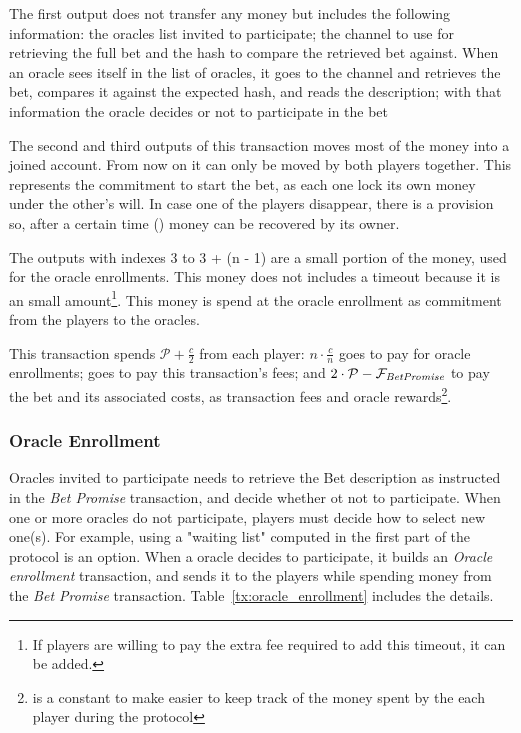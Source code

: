 The first output does not transfer any money but includes the following
  information: the oracles list invited to participate; the channel to use for
  retrieving the full bet and the hash to compare the retrieved bet against.
When an oracle sees itself in the list of oracles, it goes to the channel and
  retrieves the bet, compares it against the expected hash, and reads the
  description; with that information the oracle decides or not to participate
  in the bet

The second and third outputs of this transaction moves most of the money into
  a joined account. From now on it can only be moved by both players
  together.
This represents the commitment to start the bet, as each one lock its own money
  under the other's will.
In case one of the players disappear, there is a provision so, after a certain
  time () money can be recovered by its owner.

The outputs with indexes 3 to 3 + (n - 1) are a small portion of the money, used
  for the oracle enrollments.
This money does not includes a timeout because it is an small amount\footnote{If
  players are willing to pay the extra fee required to add this timeout, it can
  be added.}.
This money is spend at the oracle enrollment as commitment from the players to
  the oracles.

This transaction spends $\mathcal{P} + \frac{c}{2}$ from each player:
  $ n \cdot \frac{c}{n}$ goes to pay for oracle enrollments; 
  goes to pay this transaction's fees; and
  $2 \cdot \mathcal{P} - \mathcal{F}_{\mathit{Bet Promise}}$ to pay the bet and its associated
  costs, as transaction fees and oracle rewards\footnote{ is a
  constant to make easier to keep track of the money spent by the each player
  during the protocol}.

\subsubsection{Oracle Enrollment}
Oracles invited to participate needs to retrieve the Bet description as
  instructed in the \textit{Bet Promise} transaction, and decide whether ot not
  to participate.
When one or more oracles do not participate, players must decide how to select
  new one(s).
For example, using a "waiting list" computed in the first part of the protocol
  is an option.
When a oracle decides to participate, it builds an \textit{Oracle enrollment}
  transaction, and sends it to the players while spending money from the
  \textit{Bet Promise} transaction. Table~\ref{tx:oracle_enrollment} includes
  the details.

